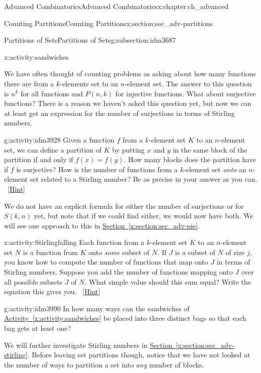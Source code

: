 \documentclass[oneside,10pt,]{book}
\numberwithin{equation}{chapter}
\begin{document}
\begin{chapterptx}{Advanced Combinatorics}{}{Advanced Combinatorics}{}{}{x:chapter:ch_advanced}
\begin{sectionptx}{Counting Partitions}{}{Counting Partitions}{}{}{x:section:sec_adv-partitions}
\begin{subsectionptx}{Partitions of Sets}{}{Partitions of Sets}{}{}{g:subsection:idm3687}
\begin{activity}{}{x:activity:sandwiches}
\end{activity}
We have often thought of counting problems as asking about how many functions there are from a \(k\)-elements set to an \(n\)-element set.  The answer to this question is \(n^k\) for all functions and \(P(n,k)\) for injective functions.  What about surjective functions?  There is a reason we haven't asked this question yet, but now we can at least get an expression for the number of surjections in terms of Stirling numbers.%
\begin{activity}{}{g:activity:idm3928}%
Given a function \(f\) from a \(k\)-element set \(K\) to an \(n\)-element set, we can define a partition of \(K\) by putting \(x\) and \(y\) in the same block of the partition if and only if \(f(x)=f(y)\). How many blocks does the partition have if \(f\) is surjective? How is the number of functions from a \(k\)-element set \emph{onto} an \(n\)-element set related to a Stirling number? Be as precise in your answer as you can.%
\qquad~\hfill{\tiny\hyperlink{g:hint:idm3949-back}{[Hint]}}\end{activity}
We do not have an explicit formula for either the number of surjections or for \(S(k,n)\) yet, but note that if we could find either, we would now have both.  We will see one approach to this in \hyperref[x:section:sec_adv-pie]{Section~\ref{x:section:sec_adv-pie}}.%
\begin{activity}{}{x:activity:Stirlingfalling}%
Each function from a \(k\)-element set \(K\) to an \(n\)-element set \(N\) is a function from \(K\) onto \emph{some} subset of \(N\). If \(J\) is a subset of \(N\) of size \(j\), you know how to compute the number of functions that map onto \(J\) in terms of Stirling numbers. Suppose you add the number of functions mapping onto \(J\) over all possible subsets \(J\) of \(N\). What simple value should this sum equal? Write the equation this gives you.%
\qquad~\hfill{\tiny\hyperlink{g:hint:idm3979-back}{[Hint]}}\end{activity}
\begin{activity}{}{g:activity:idm3990}%
In how many ways can the sandwiches of \hyperref[x:activity:sandwiches]{Activity~\ref{x:activity:sandwiches}} be placed into three distinct bags so that each bag gets at least one?%
\end{activity}
We will further investigate Stirling numbers in \hyperref[x:section:sec_adv-stirling]{Section~\ref{x:section:sec_adv-stirling}}.  Before leaving set partitions though, notice that we have not looked at the number of ways to partition a set into \emph{any} number of blocks.%

\end{subsectionptx}
\end{sectionptx}
\end{chapterptx}
\end{document}

